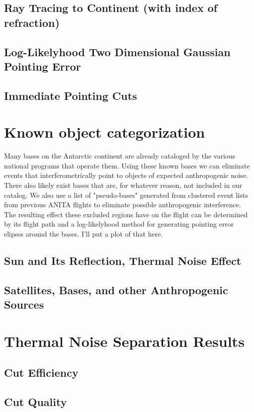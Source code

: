 	\subsection{Ray Tracing to Continent (with index of refraction)}
	\subsection{Log-Likelyhood Two Dimensional Gaussian Pointing Error}
	\subsection{Immediate Pointing Cuts}


\section{Known object categorization}
	Many bases on the Antarctic continent are already cataloged by the various national programs that operate them.  Using these known bases we can eliminate events that interferometrically point to objects of expected anthropogenic noise.  There also likely exist bases that are, for whatever reason, not included in our catalog.  We also use a list of "pseudo-bases" generated from clustered event lists from previous ANITA flights to eliminate possible anthropogenic interference.  The resulting effect these excluded regions have on the flight can be determined by its flight path and a log-likelyhood method for generating pointing error elipses around the bases.  I'll put a plot of that here.
	\subsection{Sun and Its Reflection, Thermal Noise Effect}
	\subsection{Satellites, Bases, and other Anthropogenic Sources}

\section{Thermal Noise Separation Results}
	\subsection{Cut Efficiency}
	\subsection{Cut Quality}


